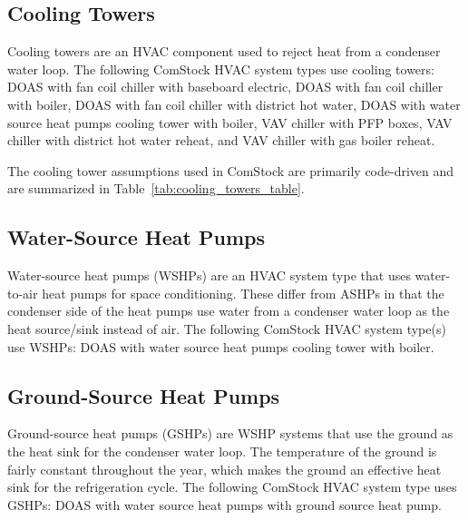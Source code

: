 \subsection{Cooling Towers}

Cooling towers are an HVAC component used to reject heat from a condenser water loop. The following ComStock HVAC system types use cooling towers: DOAS with fan coil chiller with baseboard electric, DOAS with fan coil chiller with boiler, DOAS with fan coil chiller with district hot water, DOAS with water source heat pumps cooling tower with boiler, VAV chiller with PFP boxes, VAV chiller with district hot water reheat, and VAV chiller with gas boiler reheat.

The cooling tower assumptions used in ComStock are primarily code-driven and are summarized in Table~\ref{tab:cooling_towers_table}.



\subsection{Water-Source Heat Pumps}

Water-source heat pumps (WSHPs) are an HVAC system type that uses water-to-air heat pumps for space conditioning. These differ from ASHPs in that the condenser side of the heat pumps use water from a condenser water loop as the heat source/sink instead of air. The following ComStock HVAC system type(s) use WSHPs: DOAS with water source heat pumps cooling tower with boiler.

\subsection{Ground-Source Heat Pumps}
Ground-source heat pumps (GSHPs) are WSHP systems that use the ground as the heat sink for the condenser water loop. The temperature of the ground is fairly constant throughout the year, which makes the ground an effective heat sink for the refrigeration cycle. The following ComStock HVAC system type uses GSHPs: DOAS with water source heat pumps with ground source heat pump.

